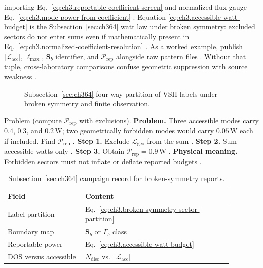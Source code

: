 importing Eq.~\eqref{eq:ch3.reportable-coefficient-screen} and normalized flux gauge
Eq.~\eqref{eq:ch3.mode-power-from-coefficient} \cite{poynting1884}. Equation
\eqref{eq:ch3.accessible-watt-budget} is the Subsection~\ref{sec:ch364} watt law under broken symmetry: excluded
sectors do not enter sums even if mathematically present in Eq.~\eqref{eq:ch3.normalized-coefficient-resolution}
\cite{harrington2001}.
As a worked example, publish \(|\mathcal{L}_{\mathrm{acc}}|\), \(\ell_{\max}\), \(\mathbf{S}_{b}\) identifier, and
\(\mathcal{P}_{\mathrm{rep}}\) alongside raw pattern files \cite{harrington2001}. Without that tuple,
cross-laboratory comparisons confuse geometric suppression with source weakness \cite{hansen1988}.
\begin{figure}[t]
\centering
{}
\caption{Subsection~\ref{sec:ch364} four-way partition of VSH labels under broken symmetry and finite observation.}
\label{fig:ch3.364-four-sector}
\end{figure}
Problem (compute \(\mathcal{P}_{\mathrm{rep}}\) with exclusions). \textbf{Problem.} Three accessible modes carry \(0.4\), \(0.3\), and \(0.2\,\mathrm{W}\); two geometrically forbidden modes
would carry \(0.05\,\mathrm{W}\) each if included. Find \(\mathcal{P}_{\mathrm{rep}}\) \cite{harrington2001}.
\textbf{Step 1.} Exclude \(\mathcal{L}_{\mathrm{geo}}\) from the sum \cite{stratton1941}.
\textbf{Step 2.} Sum accessible watts only \cite{poynting1884}.
\textbf{Step 3.} Obtain \(\mathcal{P}_{\mathrm{rep}}=0.9\,\mathrm{W}\) \cite{harrington2001}.
\textbf{Physical meaning.} Forbidden sectors must not inflate or deflate reported budgets \cite{harrington2001}.
\begin{table}[t]
\centering
\caption{Subsection~\ref{sec:ch364} campaign record for broken-symmetry reports.}
\label{tab:ch3.364-campaign-metadata}
\small
\begin{tabular}{@{}p{0.30\linewidth}p{0.58\linewidth}@{}}
\toprule
Field & Content \\
\midrule
Label partition & Eq.~\eqref{eq:ch3.broken-symmetry-sector-partition} \\
Boundary map & \(\mathbf{S}_{b}\) or \(\Gamma_{b}\) class \\
Reportable power & Eq.~\eqref{eq:ch3.accessible-watt-budget} \\
DOS versus accessible & \(N_{\mathrm{disc}}\) vs.\ \(|\mathcal{L}_{\mathrm{acc}}|\) \\
\bottomrule
\end{tabular}
\end{table}
